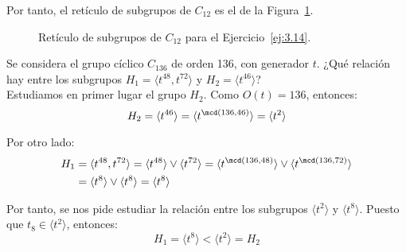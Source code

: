 \begin{ejercicio}
\begin{enumerate}
        Por tanto, el retículo de subgrupos de $C_{12}$ es el de la Figura~\ref{fig:ej14_12}.
        \begin{figure}
            \centering
            \caption{Retículo de subgrupos de $C_{12}$ para el Ejercicio~\ref{ej:3.14}.}
            \label{fig:ej14_12}
        \end{figure}
    \end{enumerate}
\end{ejercicio}

\begin{ejercicio}\label{ej:3.15}
    Se considera el grupo cíclico $C_{136}$ de orden 136, con generador $t$. ¿Qué relación hay entre los subgrupos $H_1 = \langle t^{48}, t^{72} \rangle$ y $H_2 = \langle t^{46} \rangle$?\\

    Estudiamos en primer lugar el grupo $H_2$. Como $O(t)=136$, entonces:
    \begin{equation*}
        H_2 = \langle t^{46}\rangle = \langle t^{\mcd(136,46)}\rangle = \langle t^2\rangle
    \end{equation*}

    Por otro lado:
    \begin{align*}
        H_1 &= \langle t^{48}, t^{72}\rangle = \langle t^{48}\rangle \vee \langle t^{72}\rangle = \langle t^{\mcd(136,48)}\rangle \vee \langle t^{\mcd(136,72)}\rangle\\
        &= \langle t^8\rangle \vee \langle t^{8}\rangle = \langle t^8\rangle
    \end{align*}

    Por tanto, se nos pide estudiar la relación entre los subgrupos $\langle t^2\rangle$ y $\langle t^8\rangle$. Puesto que $t_8\in \langle t^2\rangle$, entonces:
    \begin{equation*}
        H_1 = \langle t^8\rangle < \langle t^2\rangle = H_2
    \end{equation*}
\end{ejercicio}

